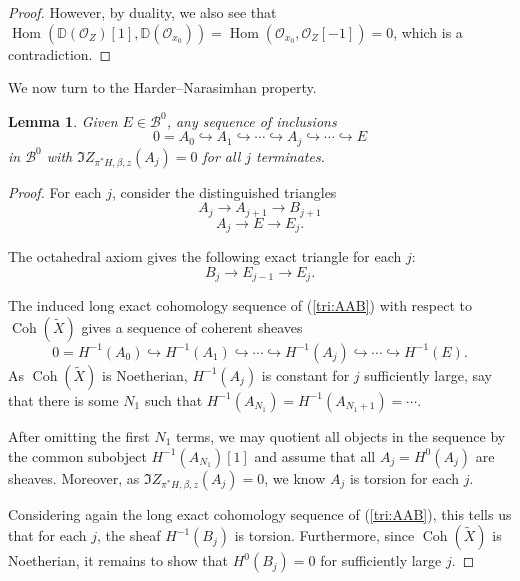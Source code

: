 \documentclass[12pt]{amsart}
\newtheorem{lemma}[theorem]{Lemma}
\theoremstyle{definition}
\DeclareMathOperator{\Hom}{Hom}
\DeclareMathOperator{\Coh}{Coh}
\begin{document}
\begin{proof}
However, by duality, we also see that $\Hom(\mathbb{D}(\mathcal{O}_Z)[1],\mathbb{D}(\mathcal{O}_{x_0})) = \Hom(\mathcal{O}_{x_0}, \mathcal{O}_Z[-1])=0$, which is a contradiction.
\end{proof}

We now turn to the Harder--Narasimhan property.

\begin{lemma}\label{HNprop}
Given $E \in \mathcal{B}^0$, any sequence of inclusions
\[ 0 = A_0 \hookrightarrow A_1 \hookrightarrow \cdots \hookrightarrow A_j \hookrightarrow \cdots \hookrightarrow E \]
in $\mathcal{B}^0$ with $\Im Z_{\pi^\ast H,\beta,z}(A_j)=0$ for all $j$ terminates.
\end{lemma}
\begin{proof}
For each $j$, consider the distinguished triangles 
\begin{equation}\label{tri:AAB}
A_j \longrightarrow A_{j+1} \longrightarrow B_{j+1}
\end{equation}
\begin{equation}\label{tri:AEE}
A_j \longrightarrow E \longrightarrow E_j.
\end{equation}

The octahedral axiom gives the following exact triangle for each $j$:
\begin{equation}\label{tri:BEE}
B_j \longrightarrow E_{j-1} \longrightarrow E_j. 
\end{equation}


The induced long exact cohomology sequence of (\ref{tri:AAB}) with respect to $\Coh(\widetilde{X})$ gives a sequence of coherent sheaves 
$$ 0 = H^{-1}(A_0) \hookrightarrow H^{-1}(A_1) \hookrightarrow \cdots \hookrightarrow H^{-1}(A_j)  \hookrightarrow \cdots \hookrightarrow H^{-1}(E). $$ 
As $\Coh(\widetilde{X})$ is Noetherian,
$H^{-1}(A_j)$ is constant for $j$ sufficiently large, say that there is some $N_1$ such that $H^{-1}(A_{N_1})=H^{-1}(A_{N_1+1})= \cdots$.


After omitting the first $N_1$ terms, we may quotient all objects in the sequence by the common subobject $H^{-1}(A_{N_1})[1]$ and assume that all $A_j=H^0(A_j)$ are sheaves.
Moreover, as $\Im Z_{\pi^\ast H,\beta,z}(A_j)=0$, we know $A_j$ is torsion for each $j$.


Considering again the long exact cohomology sequence of (\ref{tri:AAB}),
this tells us that for each $j$, the sheaf $H^{-1}(B_j)$ is torsion.
Furthermore, since $\Coh(\widetilde{X})$ is Noetherian, it remains to show that $H^0(B_j)=0$ for sufficiently large $j$.


\end{proof}
\end{document}

